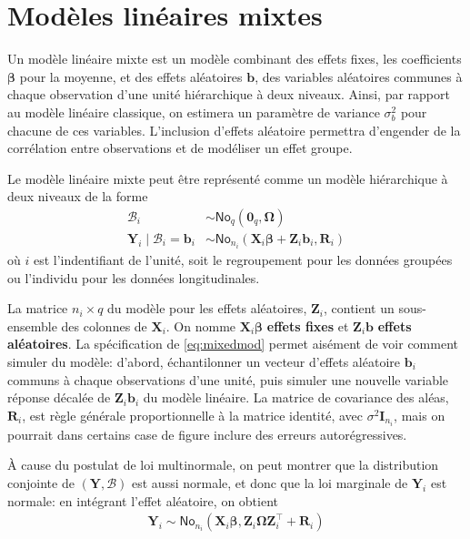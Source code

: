 \documentclass[
  11pt,
  letterpaper,
]{article}
\theoremstyle{definition}
\theoremstyle{definition}
\theoremstyle{definition}
\theoremstyle{definition}
\theoremstyle{remark}
\begin{document}
\hypertarget{modeles-lineaires-mixtes}{%
\section{Modèles linéaires mixtes}\label{modeles-lineaires-mixtes}}

Un modèle linéaire mixte est un modèle combinant des effets fixes, les coefficients \(\boldsymbol{\beta}\) pour la moyenne, et des effets aléatoires \(\boldsymbol{b}\), des variables aléatoires communes à chaque observation d'une unité hiérarchique à deux niveaux. Ainsi, par rapport au modèle linéaire classique, on estimera un paramètre de variance \(\sigma^2_b\) pour chacune de ces variables. L'inclusion d'effets aléatoire permettra d'engender de la corrélation entre observations et de modéliser un effet groupe.

Le modèle linéaire mixte peut être représenté comme un modèle hiérarchique à deux niveaux de la forme
\begin{align}
\mathcal{B}_i &\sim \mathsf{No}_q(\boldsymbol{0}_q, \boldsymbol{\Omega}) \nonumber\\
\boldsymbol{Y}_i \mid \mathcal{B}_i=\boldsymbol{b}_i &\sim \mathsf{No}_{n_i}(\mathbf{X}_i\boldsymbol{\beta} + \mathbf{Z}_i\boldsymbol{b}_i, \mathbf{R}_i) \label{eq:mixedmod}
\end{align}
où \(i\) est l'indentifiant de l'unité, soit le regroupement pour les données groupées ou l'individu pour les données longitudinales.

La matrice \(n_i \times q\) du modèle pour les effets aléatoires, \(\mathbf{Z}_i\), contient un sous-ensemble des colonnes de \(\mathbf{X}_i\). On nomme \(\mathbf{X}_i\boldsymbol{\beta}\) \textbf{effets fixes} et \(\mathbf{Z}_i\boldsymbol{b}\) \textbf{effets aléatoires}.
La spécification de \eqref{eq:mixedmod} permet aisément de voir comment simuler du modèle: d'abord, échantilonner un vecteur d'effets aléatoire \(\boldsymbol{b}_i\) communs à chaque observations d'une unité, puis simuler une nouvelle variable réponse décalée de \(\mathbf{Z}_i\boldsymbol{b}_i\) du modèle linéaire. La matrice de covariance des aléas, \(\mathbf{R}_i\), est règle générale proportionnelle à la matrice identité, avec \(\sigma^2\mathbf{I}_{n_i}\), mais on pourrait dans certains case de figure inclure des erreurs autorégressives.

À cause du postulat de loi multinormale, on peut montrer que la distribution conjointe de \((\boldsymbol{Y}, \mathcal{B})\) est aussi normale, et donc que la loi marginale de \(\boldsymbol{Y}_i\) est normale: en intégrant l'effet aléatoire, on obtient
\begin{align}
\boldsymbol{Y}_i \sim \mathsf{No}_{n_i}( \mathbf{X}_i \boldsymbol{\beta}, \mathbf{Z}_i\boldsymbol{\Omega}\mathbf{Z}_i^\top + \mathbf{R}_i)  \label{eq:margmodmixed}
\end{align}
\end{document}
